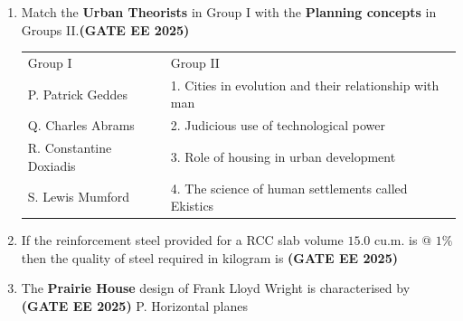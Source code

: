 \documentclass[journal,12pt,onecolumn]{IEEEtran}
\theoremstyle{remark}
\begin{document}
\begin{enumerate}
\begin{enumerate}
\end{enumerate}
\item Match the \textbf{Urban Theorists} in Group I with the \textbf{Planning concepts} in Groups II.\hfill \textbf{(GATE EE 2025)}
\newline
\begin{tabular}{p{}p{}}
Group I     & Group II \\
P. Patrick Geddes     & 1. Cities in evolution and their relationship with man\\
Q. Charles Abrams  & 2. Judicious use of  technological power\\
R. Constantine Doxiadis & 3. Role of housing in urban development\\
S. Lewis Mumford & 4. The science of human settlements called Ekistics\\
\end{tabular}
\begin{enumerate}
\end{enumerate}
\item If the reinforcement steel provided for a RCC slab volume $15.0$ cu.m. is @ $1\%$ then the quality of steel required in kilogram is \hfill \textbf{(GATE EE 2025)}
\begin{enumerate}
\end{enumerate}
\item The \textbf{Prairie House} design of Frank Lloyd Wright is characterised by \hfill \textbf{(GATE EE 2025)}
\newline
P. Horizontal planes

\end{enumerate}
\end{document}
